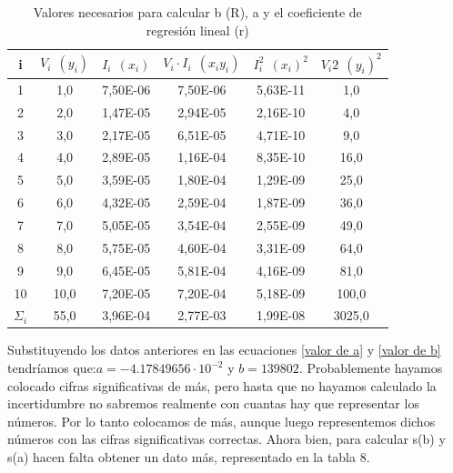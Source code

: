 \documentclass[10pt,a4paper]{article}
\begin{document}
\begin{table}[h] %
\begin{center}
\begin{tabular}{| c | c | c | c | c | c |}
\hline i & $V_i \ \  (y_i)$ & $I_i \ \ (x_i)$ & $V_i \cdot I_i \ \ (x_iy_i)$ & $I_i^2 \ \ (x_i)^2$ & $V_i 2 \ \ (y_i)^2$
  \\ \hline
1 & 1,0 & 7,50E-06 & 7,50E-06 & 5,63E-11 & 1,0
  \\ 
2 & 2,0 & 1,47E-05 & 2,94E-05 & 2,16E-10 & 4,0
  \\ 
3 & 3,0 & 2,17E-05 & 6,51E-05 & 4,71E-10 & 9,0
  \\ 
4 & 4,0 & 2,89E-05 & 1,16E-04 & 8,35E-10 & 16,0
  \\ 
5 & 5,0 & 3,59E-05 & 1,80E-04 & 1,29E-09 & 25,0
  \\ 
6 & 6,0 & 4,32E-05 & 2,59E-04 & 1,87E-09 & 36,0
  \\ 
7 & 7,0 & 5,05E-05 & 3,54E-04 & 2,55E-09 & 49,0
  \\ 
8 & 8,0 & 5,75E-05 & 4,60E-04 & 3,31E-09 & 64,0
  \\ 
9 & 9,0 & 6,45E-05 & 5,81E-04 & 4,16E-09 & 81,0
  \\ 
10 & 10,0 & 7,20E-05 & 7,20E-04 & 5,18E-09 & 100,0
  \\  \hline
$\Sigma_i$ & 55,0 & 3,96E-04 & 2,77E-03 & 1,99E-08 & 3025,0  \\ \hline
 
\end{tabular}
\caption{Valores necesarios para calcular b (R), a y el coeficiente de regresión lineal (r)}
\end{center}
\end{table} 

Substituyendo los datos anteriores en las ecuaciones \ref{valor de a} y \ref{valor de b} tendríamos que:$a = -4.17849656 \cdot 10^{-2}$ y $b=139802$. Probablemente hayamos colocado cifras significativas de más, pero hasta que no hayamos calculado la incertidumbre no sabremos realmente con cuantas hay que representar los números. Por lo tanto colocamos de más, aunque luego representemos dichos números con las cifras significativas correctas.
Ahora bien, para calcular s(b) y s(a) hacen falta obtener un dato más, representado en la tabla 8. \\
\end{document}

